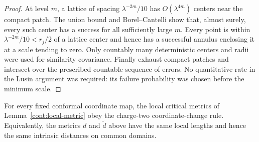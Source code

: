 \begin{proof}
At level $m$, a lattice of spacing $\lambda^{-2m}/10$ has
$O(\lambda^{4m})$ centers near the compact patch.  The union bound and
Borel--Cantelli show that, almost surely, every such center has a success
for all sufficiently large $m$.  Every point is within
$\lambda^{-2m}/10<r_j/2$ of a lattice center and hence has a successful
annulus enclosing it at a scale tending to zero.  Only countably many
deterministic centers and radii were used for similarity covariance.
Finally exhaust compact patches and intersect over the prescribed
countable sequence of errors.  No quantitative rate in the Lusin argument
was required: its failure probability was chosen before the minimum scale.
\end{proof}

\begin{proposition}\label{cont:metric-covariance}
For every fixed conformal coordinate map, the local critical metrics of
Lemma~\ref{cont:local-metric} obey the charge-two coordinate-change rule.
Equivalently, the metrics $d$ and $\widetilde d$ above have the same local
lengths and hence the same intrinsic distances on common domains.
\end{proposition}

